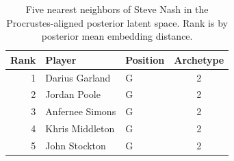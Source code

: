 \begin{table}[htbp]
  \centering\small
  \begin{tabular}{rllc}
    \toprule
    Rank & Player & Position & Archetype \\
    \midrule
    1 & Darius Garland & G & 2 \\
    2 & Jordan Poole & G & 2 \\
    3 & Anfernee Simons & G & 2 \\
    4 & Khris Middleton & G & 2 \\
    5 & John Stockton & G & 2 \\
    \bottomrule
  \end{tabular}
  \caption{Five nearest neighbors of Steve Nash in the Procrustes-aligned posterior latent space. Rank is by posterior mean embedding distance.}
  \label{tab:Steve_Nash_neighbors}
\end{table}

